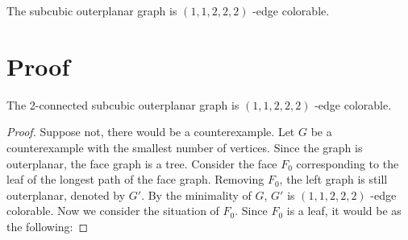 \documentclass[a4paper]{article}
\begin{document}
\begin{conjecture}
The subcubic outerplanar graph is $(1,1,2,2,2)$ -edge colorable.
\end{conjecture}
\section{Proof}
\begin{lemma}
    The 2-connected subcubic outerplanar graph is $(1,1,2,2,2)$ -edge colorable.
\end{lemma}
\begin{proof}
    Suppose not, there would be a counterexample. Let $G$ be a counterexample with the smallest number of vertices. Since the graph is outerplanar, the face graph is a tree. Consider the face $F_0$ corresponding to the leaf of the longest path of the face graph. Removing $F_0$, the left graph is still outerplanar, denoted by $G'$. By the minimality of $G$, $G'$ is $(1,1,2,2,2)$ -edge colorable. Now we consider the situation of $F_0$. Since $F_0$ is a leaf, it would be as the following:
\end{proof}
\end{document}
